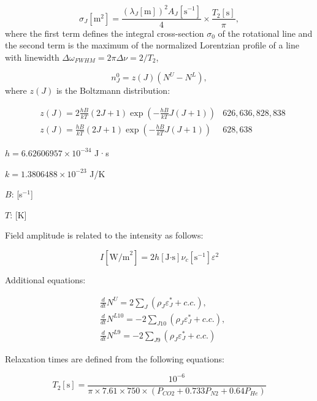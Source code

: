 \documentclass{report}
\begin{document}
\begin{equation*}
{\sigma _J}[\text{m}^2] = \frac{(\lambda _J[\text{m}])^2 A_J[\text{s}^{-1}]}{4} \times \frac{T_2[\text{s}]}{\pi},
\end{equation*}
where the first term defines the integral cross-section $\sigma_0$ of the rotational line \cite{Hilborn-2002} and the second term is the maximum of the normalized Lorentzian profile of a line with linewidth $\Delta\omega _{FWHM}=2\pi\Delta\nu=2/T_2$,

\begin{equation*}
n_J^0 = z(J)(N^U-N^L),
\end{equation*}
where $z(J)$ is the Boltzmann distribution:

\begin{align*}
&z(J) = 2\frac{hB}{kT}(2J+1)\exp \left(-\frac{hB}{kT}J(J+1)\right)&626, 636, 828, 838\\
&z(J) = \frac{hB}{kT}(2J+1)\exp \left(-\frac{hB}{kT}J(J+1)\right)&628, 638
\end{align*}

$h = 6.62606957\times 10^{-34}$ J·s

$k = 1.3806488\times 10^{-23}$ J/K

$B$: [s$^{-1}$]

$T$: [K]

Field amplitude is related to the intensity as follows:

\begin{equation}\label{eq:I}
I[\text{W/m}^2] = 2 h[\text{J·s}] \nu _c[\text{s}^{-1}] \varepsilon ^2
\end{equation}

Additional equations:

\begin{align}\label{eq:dNdt}
&\frac{d}{dt}N^U = 2\sum\limits_J (\rho _J\varepsilon _J^* + c.c.) ,\nonumber\\
&\frac{d}{dt}N^{L10} =  -2\sum\limits_{J10} (\rho _J\varepsilon _J^* + c.c.),\\
&\frac{d}{dt}N^{L9} =  -2\sum\limits_{J9} (\rho _J\varepsilon _J^* + c.c.)\nonumber
\end{align}

Relaxation times are defined from the following equations:

\begin{equation}\label{eq:T2}
T_2[\text{s}] = \frac{10^{- 6}}{\pi \times 7.61 \times 750 \times (P_{CO2}+0.733P_{N2}+0.64P_{He})}
\end{equation}
\end{document}

